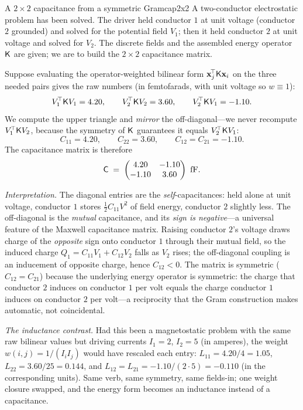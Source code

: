 \begin{workedexample}{A $2\times 2$ capacitance from a symmetric Gram}{cap2x2}
A two-conductor electrostatic problem has been solved. The driver held conductor
$1$ at unit voltage (conductor $2$ grounded) and solved for the potential field
$V_1$; then it held conductor $2$ at unit voltage and solved for $V_2$. The
discrete fields and the assembled energy operator $\mathsf{K}$ are given; we are to
build the $2\times 2$ capacitance matrix.

Suppose evaluating the operator-weighted bilinear form $\mathbf{x}_j^{\!\top}\mathsf{K}\mathbf{x}_i$
on the three needed pairs gives the raw numbers (in femtofarads, with unit
voltage so $w\equiv 1$):
\[
  V_1^{\!\top}\mathsf{K} V_1 = 4.20,\qquad
  V_2^{\!\top}\mathsf{K} V_2 = 3.60,\qquad
  V_2^{\!\top}\mathsf{K} V_1 = -1.10 .
\]
We compute the upper triangle and \emph{mirror} the off-diagonal---we never
recompute $V_1^{\!\top}\mathsf{K} V_2$, because the symmetry of $\mathsf{K}$ guarantees it
equals $V_2^{\!\top}\mathsf{K} V_1$:
\[
  C_{11}=4.20,\qquad
  C_{22}=3.60,\qquad
  C_{12}=C_{21}=-1.10 .
\]
The capacitance matrix is therefore
\[
  \mat{C} \;=\;
  \begin{pmatrix} 4.20 & -1.10 \\ -1.10 & 3.60 \end{pmatrix}\ \si{\femto\farad}.
\]

\emph{Interpretation.} The diagonal entries are the \emph{self}-capacitances:
held alone at unit voltage, conductor $1$ stores $\tfrac12 C_{11}V^2$ of field
energy, conductor $2$ slightly less. The off-diagonal is the \emph{mutual}
capacitance, and its \emph{sign is negative}---a universal feature of the
Maxwell capacitance matrix. Raising conductor $2$'s voltage draws charge of the
\emph{opposite} sign onto conductor $1$ through their mutual field, so the
induced charge $Q_1=C_{11}V_1+C_{12}V_2$ falls as $V_2$ rises; the off-diagonal
coupling is an inducement of opposite charge, hence $C_{12}<0$. The matrix is
symmetric ($C_{12}=C_{21}$) because the underlying energy operator is symmetric:
the charge that conductor $2$ induces on conductor $1$ per volt equals the charge
conductor $1$ induces on conductor $2$ per volt---a reciprocity that the Gram
construction makes automatic, not coincidental.

\emph{The inductance contrast.} Had this been a magnetostatic problem with the
same raw bilinear values but driving currents $I_1=2$, $I_2=5$ (in amperes), the
weight $w(i,j)=1/(I_iI_j)$ would have rescaled each entry:
$L_{11}=4.20/4=1.05$, $L_{22}=3.60/25=0.144$, and
$L_{12}=L_{21}=-1.10/(2\cdot 5)=-0.110$ (in the corresponding units). Same verb,
same symmetry, same fields-in; one weight closure swapped, and the energy form
becomes an inductance instead of a capacitance.
\end{workedexample}

